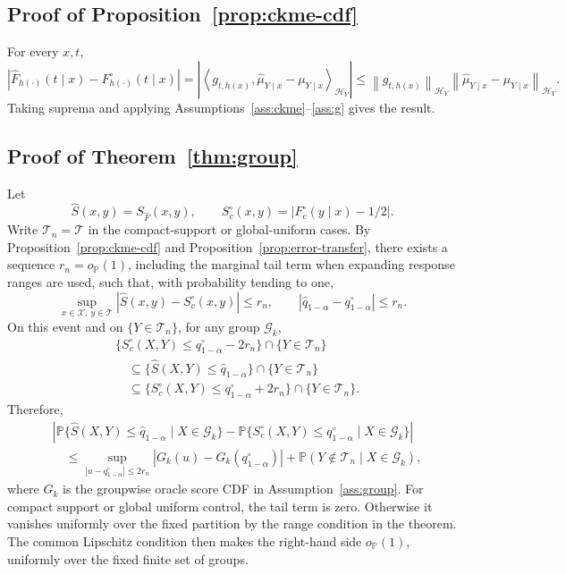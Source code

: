 \documentclass[11pt]{article}
\newcommand{\Xcal}{\mathcal X}
\newcommand{\Hcal}{\mathcal H}
\newcommand{\Gcal}{\mathcal G}
\newcommand{\Tcal}{\mathcal T}
\newcommand{\Pp}{\mathbb P}
\newcommand{\norm}[1]{\left\lVert #1 \right\rVert}
\newcommand{\abs}[1]{\left\lvert #1 \right\rvert}
\newcommand{\inner}[2]{\left\langle #1,#2 \right\rangle}
\newcommand{\op}{o_{\mathbb P}}
\begin{document}
\subsection{Proof of Proposition~\ref{prop:ckme-cdf}}

For every \(x,t\),
\[
  \abs{\widehat F_{h(\cdot)}(t\mid x)-F_{h(\cdot)}^\circ(t\mid x)}
  =
  \abs{\inner{g_{t,h(x)}}{\widehat\mu_{Y\mid x}-\mu_{Y\mid x}}_{\Hcal_Y}}
  \le
  \norm{g_{t,h(x)}}_{\Hcal_Y}
  \norm{\widehat\mu_{Y\mid x}-\mu_{Y\mid x}}_{\Hcal_Y}.
\]
Taking suprema and applying Assumptions~\ref{ass:ckme}--\ref{ass:g} gives the result.

\subsection{Proof of Theorem~\ref{thm:group}}

Let
\[
  \widehat S(x,y)=S_{\widehat F}(x,y),
  \qquad
  S_c^\circ(x,y)=\abs{F_c^\circ(y\mid x)-1/2}.
\]
Write \(\Tcal_n=\Tcal\) in the compact-support or global-uniform cases.
By Proposition~\ref{prop:ckme-cdf} and Proposition~\ref{prop:error-transfer}, there exists a sequence \(r_n=\op(1)\), including the marginal tail term when expanding response ranges are used, such that, with probability tending to one,
\[
  \sup_{x\in\Xcal,\ y\in\Tcal}
  \abs{\widehat S(x,y)-S_c^\circ(x,y)}\le r_n,
  \qquad
  \abs{\widehat q_{1-\alpha}-q^\circ_{1-\alpha}}\le r_n.
\]
On this event and on \(\{Y\in\Tcal_n\}\), for any group \(\Gcal_k\),
\[
\begin{aligned}
  &\{S_c^\circ(X,Y)\le q^\circ_{1-\alpha}-2r_n\}
    \cap\{Y\in\Tcal_n\} \\
  &\quad\subseteq
    \{\widehat S(X,Y)\le \widehat q_{1-\alpha}\}
    \cap\{Y\in\Tcal_n\} \\
  &\quad\subseteq
    \{S_c^\circ(X,Y)\le q^\circ_{1-\alpha}+2r_n\}
    \cap\{Y\in\Tcal_n\}.
\end{aligned}
\]
Therefore,
\[
\begin{aligned}
  &\abs{
  \Pp\{\widehat S(X,Y)\le\widehat q_{1-\alpha}\mid X\in\Gcal_k\}
  -
  \Pp\{S_c^\circ(X,Y)\le q^\circ_{1-\alpha}\mid X\in\Gcal_k\}
  }  \\
  &\quad\le
  \sup_{\abs{u-q^\circ_{1-\alpha}}\le 2r_n}
  \abs{G_k(u)-G_k(q^\circ_{1-\alpha})}
  +
  \Pp(Y\notin\Tcal_n\mid X\in\Gcal_k),
\end{aligned}
\]
where \(G_k\) is the groupwise oracle score CDF in Assumption~\ref{ass:group}. For compact support or global uniform control, the tail term is zero. Otherwise it vanishes uniformly over the fixed partition by the range condition in the theorem. The common Lipschitz condition then makes the right-hand side \(\op(1)\), uniformly over the fixed finite set of groups.
\end{document}
